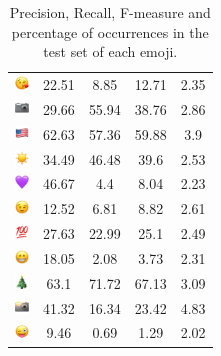 \documentclass{article}
\begin{document}
\begin{table}
\begin{tabular}{|c|ccc|c|}
\includegraphics[height=0.37cm,width=0.37cm]{img/face_blowing_a_kiss.png} & 22.51 & 8.85 & 12.71 & 2.35\\ 
\includegraphics[height=0.37cm,width=0.37cm]{img/camera.png} & 29.66 & 55.94 & 38.76 & 2.86\\ 
\includegraphics[height=0.37cm,width=0.37cm]{img/United_States.png} & 62.63 & 57.36 & 59.88 & 3.9\\ 
\includegraphics[height=0.37cm,width=0.37cm]{img/sun.png} & 34.49 & 46.48 & 39.6 & 2.53\\ 
\includegraphics[height=0.37cm,width=0.37cm]{img/purple_heart.png} & 46.67 & 4.4 & 8.04 & 2.23\\ 
\includegraphics[height=0.37cm,width=0.37cm]{img/winking_face.png} & 12.52 & 6.81 & 8.82 & 2.61\\ 
\includegraphics[height=0.37cm,width=0.37cm]{img/hundred_points.png} & 27.63 & 22.99 & 25.1 & 2.49\\ 
\includegraphics[height=0.37cm,width=0.37cm]{img/beaming_face_with_smiling_eyes.png} & 18.05 & 2.08 & 3.73 & 2.31\\ 
\includegraphics[height=0.37cm,width=0.37cm]{img/Christmas_tree.png} & 63.1 & 71.72 & 67.13 & 3.09\\ 
\includegraphics[height=0.37cm,width=0.37cm]{img/camera_with_flash.png} & 41.32 & 16.34 & 23.42 & 4.83\\ 
\includegraphics[height=0.37cm,width=0.37cm]{img/winking_face_with_tongue.png} & 9.46 & 0.69 & 1.29 & 2.02\\ 

\hline
\end{tabular}
\caption{\label{table:emoji_detailed} Precision, Recall, F-measure and percentage of occurrences in the test set of each emoji.}
\end{table}
\end{document}

